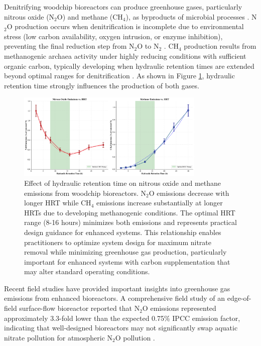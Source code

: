 \documentclass[12pt,a4paper]{article}
\begin{document}
Denitrifying woodchip bioreactors can produce greenhouse gases, particularly nitrous oxide (N$_{2}$O) and methane (CH$_{4}$), as byproducts of microbial processes \citep{RN1181, RN611}. N$_{2}$O production occurs when denitrification is incomplete due to environmental stress (low carbon availability, oxygen intrusion, or enzyme inhibition), preventing the final reduction step from N$_{2}$O to N$_{2}$ \citep{RN708}. CH$_{4}$ production results from methanogenic archaea activity under highly reducing conditions with sufficient organic carbon, typically developing when hydraulic retention times are extended beyond optimal ranges for denitrification \citep{RN708}. As shown in Figure \ref{fig:greenhouse_gas}, hydraulic retention time strongly influences the production of both gases.

\begin{figure}[H]
\centering
\includegraphics[width=0.8\textwidth]{fig6_greenhouse_gas_scientific}
\caption{Effect of hydraulic retention time on nitrous oxide and methane emissions from woodchip bioreactors. N$_2$O emissions decrease with longer HRT while CH$_4$ emissions increase substantially at longer HRTs due to developing methanogenic conditions. The optimal HRT range (8-16 hours) minimizes both emissions and represents practical design guidance for enhanced systems. This relationship enables practitioners to optimize system design for maximum nitrate removal while minimizing greenhouse gas production, particularly important for enhanced systems with carbon supplementation that may alter standard operating conditions.}
\label{fig:greenhouse_gas}
\end{figure}

Recent field studies have provided important insights into greenhouse gas emissions from enhanced bioreactors. A comprehensive field study of an edge-of-field surface-flow bioreactor reported that N$_{2}$O emissions represented approximately 3.3-fold lower than the expected 0.75\% IPCC emission factor, indicating that well-designed bioreactors may not significantly swap aquatic nitrate pollution for atmospheric N$_{2}$O pollution \citep{RN1181}.
\end{document}
